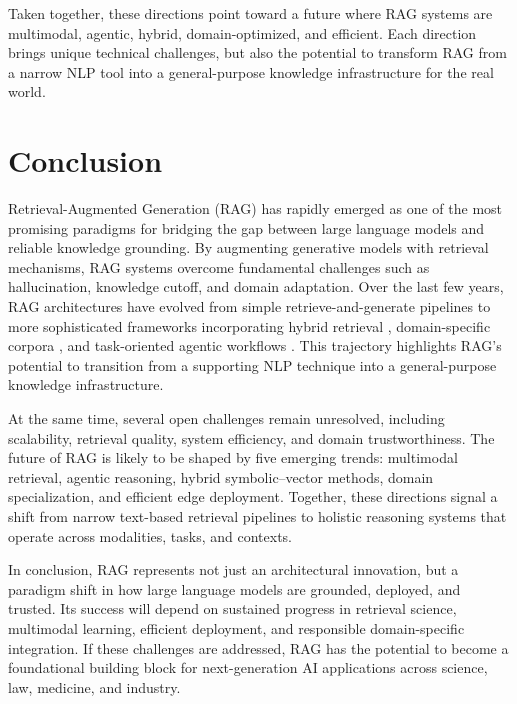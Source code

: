 \documentclass[conference]{IEEEtran}
\begin{document}
\bigskip
Taken together, these directions point toward a future where RAG systems are multimodal, agentic, hybrid, domain-optimized, and efficient. Each direction brings unique technical challenges, but also the potential to transform RAG from a narrow NLP tool into a general-purpose knowledge infrastructure for the real world.


\section{Conclusion}

Retrieval-Augmented Generation (RAG) has rapidly emerged as one of the most promising paradigms for bridging the gap between large language models and reliable knowledge grounding. By augmenting generative models with retrieval mechanisms, RAG systems overcome fundamental challenges such as hallucination, knowledge cutoff, and domain adaptation. Over the last few years, RAG architectures have evolved from simple retrieve-and-generate pipelines \cite{lewis2020rag} to more sophisticated frameworks incorporating hybrid retrieval \cite{sun2020knowledge}, domain-specific corpora \cite{moradi2023clinicalrag}, and task-oriented agentic workflows \cite{yao2022react,wang2023voyager}. This trajectory highlights RAG’s potential to transition from a supporting NLP technique into a general-purpose knowledge infrastructure.  

At the same time, several open challenges remain unresolved, including scalability, retrieval quality, system efficiency, and domain trustworthiness. The future of RAG is likely to be shaped by five emerging trends: multimodal retrieval, agentic reasoning, hybrid symbolic–vector methods, domain specialization, and efficient edge deployment. Together, these directions signal a shift from narrow text-based retrieval pipelines to holistic reasoning systems that operate across modalities, tasks, and contexts.



In conclusion, RAG represents not just an architectural innovation, but a paradigm shift in how large language models are grounded, deployed, and trusted. Its success will depend on sustained progress in retrieval science, multimodal learning, efficient deployment, and responsible domain-specific integration. If these challenges are addressed, RAG has the potential to become a foundational building block for next-generation AI applications across science, law, medicine, and industry.


\end{document}
